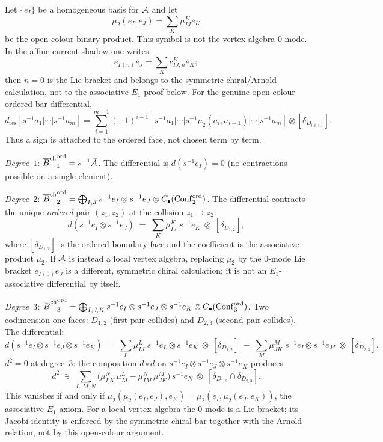 \begin{construction}
Let $\{e_I\}$ be a homogeneous basis for $\bar{\mathcal{A}}$ and let
\[
\mu_2(e_I,e_J)=\sum_K\mu^K_{IJ}e_K
\]
be the open-colour binary product.  This symbol is not the
vertex-algebra \(0\)-mode.  In the affine current shadow one writes
\[
e_I{}_{(n)}e_J=\sum_K c^K_{IJ;n}e_K ;
\]
then \(n=0\) is the Lie bracket and belongs to the symmetric
chiral/Arnold calculation, not to the associative \(E_1\) proof below.
For the genuine open-colour ordered bar differential,
\[
d_{\mathrm{res}}[s^{-1}a_1|\cdots|s^{-1}a_m]
=
\sum_{i=1}^{m-1}(-1)^{i-1}
[s^{-1}a_1|\cdots|
s^{-1}\mu_2(a_i,a_{i+1})|\cdots|s^{-1}a_m]
\otimes[\delta_{D_{i,i+1}}].
\]
Thus a sign is attached to the ordered face, not chosen term by term.

\emph{Degree~$1$}: ${\overline{B}^{\mathrm{ch}}}^{\mathrm{ord}}_1=s^{-1}\bar{\mathcal{A}}$.
The differential is $d(s^{-1}e_I)=0$ (no contractions
possible on a single element).

\emph{Degree~$2$}: ${\overline{B}^{\mathrm{ch}}}^{\mathrm{ord}}_2
=\bigoplus_{I,J}s^{-1}e_I\otimes s^{-1}e_J\otimes
C_\bullet(\mathrm{Conf}_2^{\mathrm{ord}})$.
The differential contracts the unique \emph{ordered} pair
$(z_1,z_2)$ at the collision $z_1\to z_2$:
\begin{equation}%
d(s^{-1}e_I\otimes s^{-1}e_J)
\;=\;
\sum_K\mu^K_{IJ}\;s^{-1}e_K
\;\otimes\;
[\delta_{D_{1,2}}],
\end{equation}
where $[\delta_{D_{1,2}}]$ is the ordered boundary face and the
coefficient is the associative product \(\mu_2\).  If \(\mathcal{A}\) is
instead a local vertex algebra, replacing \(\mu_2\) by the \(0\)-mode
Lie bracket \(e_I{}_{(0)}e_J\) is a different, symmetric chiral
calculation; it is not an \(E_1\)-associative differential by itself.

\emph{Degree~$3$}: ${\overline{B}^{\mathrm{ch}}}^{\mathrm{ord}}_3
=\bigoplus_{I,J,K}s^{-1}e_I\otimes s^{-1}e_J\otimes
s^{-1}e_K\otimes
C_\bullet(\mathrm{Conf}_3^{\mathrm{ord}})$.
Two codimension-one faces: $D_{1,2}$ (first pair collides)
and $D_{2,3}$ (second pair collides). The differential:
\begin{equation}%
d(s^{-1}e_I\otimes s^{-1}e_J\otimes s^{-1}e_K)
\;=\;
\sum_L \mu^L_{IJ}\;
s^{-1}e_L\otimes s^{-1}e_K
\;\otimes\;[\delta_{D_{1,2}}]
\;-\;
\sum_M \mu^M_{JK}\;
s^{-1}e_I\otimes s^{-1}e_M
\;\otimes\;[\delta_{D_{2,3}}].
\end{equation}
$d^2=0$ at degree~$3$: the composition $d\circ d$ on
$s^{-1}e_I\otimes s^{-1}e_J\otimes s^{-1}e_K$ produces
\[
d^2\;\ni\;
\sum_{L,M,N}\bigl(
\mu^N_{LK}\,\mu^L_{IJ}
-\mu^N_{IM}\,\mu^M_{JK}
\bigr)\,s^{-1}e_N
\;\otimes\;[\delta_{D_{1,2}}\cap\delta_{D_{2,3}}].
\]
This vanishes if and only if
\(\mu_2(\mu_2(e_I,e_J),e_K)
=\mu_2(e_I,\mu_2(e_J,e_K))\), the associative \(E_1\) axiom.
For a local vertex algebra the \(0\)-mode is a Lie bracket; its
Jacobi identity is enforced by the symmetric chiral bar together with
the Arnold relation, not by this open-colour argument.
\end{construction}

